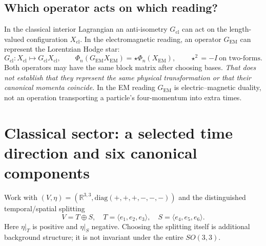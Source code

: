 \documentclass[10.5pt,a4paper]{article}
\newcommand{\R}{\mathbb R}
\newcommand{\Xcl}{X_{\mathrm{cl}}}
\newcommand{\Xem}{X_{\mathrm{EM}}}
\begin{document}
\subsection*{Which operator acts on which reading?}
In the classical interior Lagrangian an anti-isometry $G_{\mathrm{cl}}$ can act on the length-valued configuration $\Xcl$. In the electromagnetic reading, an operator $G_{\mathrm{EM}}$ can represent the Lorentzian Hodge star:
\begin{equation}\label{eq:Gtypes}
  G_{\mathrm{cl}}:\Xcl\mapsto G_{\mathrm{cl}}\Xcl,\qquad
  \Phi_n(G_{\mathrm{EM}}\Xem)=\star\Phi_n(\Xem),\qquad \star^2=-I\ \text{on two-forms}.
\end{equation}
Both operators may have the same block matrix after choosing bases. \emph{That does not establish that they represent the same physical transformation or that their canonical momenta coincide.} In the EM reading $G_{\mathrm{EM}}$ is electric--magnetic duality, not an operation transporting a particle's four-momentum into extra times.

\section{Classical sector: a selected time direction and six canonical components}
Work with $(V,\eta)=(\R^{3,3},\mathrm{diag}(+,+,+,-,-,-))$ and the distinguished temporal/spatial splitting
\begin{equation}\label{eq:split}
  V=T\oplus S,\quad T=\langle e_1,e_2,e_3\rangle,\quad S=\langle e_4,e_5,e_6\rangle.
\end{equation}
Here $\eta|_T$ is positive and $\eta|_S$ negative. Choosing the splitting itself is additional background structure; it is not invariant under the entire $SO(3,3)$.
\end{document}
